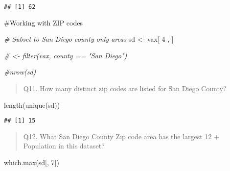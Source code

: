 \documentclass[
]{article}
\newenvironment{Shaded}{\begin{snugshade}}{\end{snugshade}}
\newcommand{\CommentTok}[1]{\textcolor[rgb]{0.56,0.35,0.01}{\textit{#1}}}
\newcommand{\DecValTok}[1]{\textcolor[rgb]{0.00,0.00,0.81}{#1}}
\newcommand{\FunctionTok}[1]{\textcolor[rgb]{0.00,0.00,0.00}{#1}}
\newcommand{\NormalTok}[1]{#1}
\newcommand{\OtherTok}[1]{\textcolor[rgb]{0.56,0.35,0.01}{#1}}
\begin{document}
\begin{verbatim}
## [1] 62
\end{verbatim}

\#Working with ZIP codes

\begin{Shaded}
\end{Shaded}

\begin{Shaded}
\begin{Highlighting}[]
\CommentTok{\# Subset to San Diego county only areas}
\NormalTok{sd }\OtherTok{\textless{}{-}}\NormalTok{ vax[ }\DecValTok{4}\NormalTok{ , ]}
\end{Highlighting}
\end{Shaded}

\begin{Shaded}
\begin{Highlighting}[]
\CommentTok{\# \textless{}{-} filter(vax, county == "San Diego")}

\CommentTok{\#nrow(sd)}
\end{Highlighting}
\end{Shaded}

\begin{quote}
Q11. How many distinct zip codes are listed for San Diego County?
\end{quote}

\begin{Shaded}
\begin{Highlighting}[]
\FunctionTok{length}\NormalTok{(}\FunctionTok{unique}\NormalTok{(sd))}
\end{Highlighting}
\end{Shaded}

\begin{verbatim}
## [1] 15
\end{verbatim}

\begin{quote}
Q12. What San Diego County Zip code area has the largest 12 + Population
in this dataset?
\end{quote}

\begin{Shaded}
\begin{Highlighting}[]
\FunctionTok{which.max}\NormalTok{(sd[, }\DecValTok{7}\NormalTok{])}
\end{Highlighting}
\end{Shaded}
\end{document}
